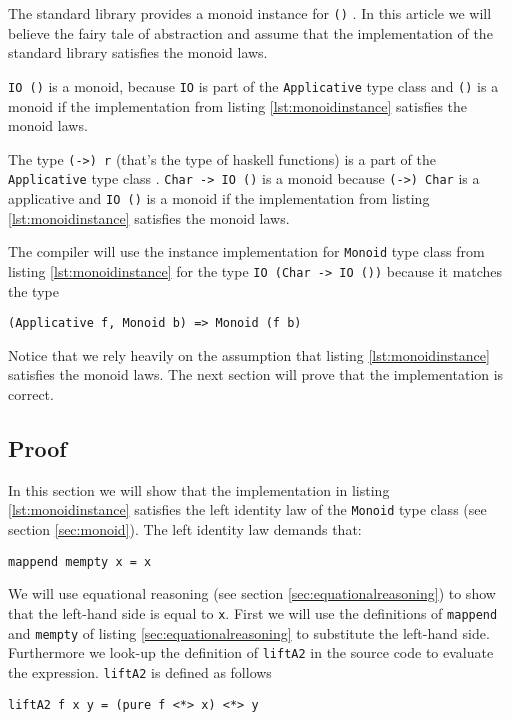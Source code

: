 \begin{etaremune}
\item The standard library provides a monoid instance for \verb|()| \cite{monoid}. In this article we will believe the fairy tale of abstraction and assume that the implementation of the standard library satisfies the monoid laws.
\item \verb|IO ()| is a monoid, because \verb|IO| is part of the \verb|Applicative| type class \cite{control.applicative} and \verb|()| is a monoid if the implementation from listing \ref{lst:monoidinstance} satisfies the monoid laws.
\item The type \verb|(->) r| (that's the type of haskell functions) is a part of the \verb|Applicative| type class \cite{control.applicative}.
 \verb|Char -> IO ()| is a monoid because \verb|(->) Char| is a applicative and \verb|IO ()| is a monoid if the implementation from listing \ref{lst:monoidinstance} satisfies the monoid laws.
\item The compiler will use the instance implementation for \verb|Monoid| type class from listing \ref{lst:monoidinstance} for the type \verb|IO (Char -> IO ())| because it matches the type
\begin{verbatim}
(Applicative f, Monoid b) => Monoid (f b)
\end{verbatim}

\end{etaremune} 

Notice that we rely heavily on the assumption that listing \ref{lst:monoidinstance} satisfies the monoid laws. The next section will prove that the implementation is correct.

\subsection{Proof}
\label{sec:exampleproof}

In this section we will show that the implementation in listing \ref{lst:monoidinstance} satisfies the left identity law of the \verb|Monoid| type class (see section \ref{sec:monoid}).
The left identity law demands that:
\begin{verbatim}
mappend mempty x = x
\end{verbatim}

We will use equational reasoning (see section \ref{sec:equationalreasoning}) to show that the left-hand side is equal to \verb|x|. First we will use the definitions of \verb|mappend| and \verb|mempty| of listing \ref{sec:equationalreasoning} to substitute the left-hand side. Furthermore we look-up the definition of \verb|liftA2| in the source code \cite{control.applicative} to evaluate the expression. 
\verb|liftA2| is defined as follows
\begin{verbatim}
liftA2 f x y = (pure f <*> x) <*> y
\end{verbatim}

